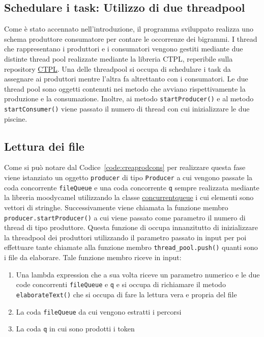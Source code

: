 \documentclass[10pt,twocolumn,letterpaper]{article}
\begin{document}
\subsection{Schedulare i task: Utilizzo di due threadpool}
\label{sub:schedularetask}
Come è stato accennato nell'introduzione, il programma sviluppato realizza uno schema produttore consumatore per contare le occorrenze dei bigrammi. I thread che
rappresentano i produttori e i consumatori vengono gestiti mediante due distinte thread pool realizzate mediante la libreria CTPL, reperibile sulla repository \href{https://github.com/vit-vit/CTPL}{CTPL}. Una delle threadpool si occupa di schedulare i task
da assegnare ai produttori mentre l'altra fa altrettanto con i consumatori. Le due thread pool sono oggetti contenuti nei metodo che avviano rispettivamente la produzione e la consumazione. Inoltre, ai metodo \texttt{startProducer()} e al metodo \texttt{startConsumer()} viene passato il numero di thread con cui inizializzare le due piscine.



\subsection{Lettura dei file}
\label{sub:letturafile}
Come si può notare dal Codice~\ref{code:creaprodcons} per realizzare questa fase viene istanziato un oggetto \texttt{producer} di tipo \texttt{Producer} a cui vengono passate la coda concorrente \texttt{fileQueue} e una coda concorrente \texttt{q}
sempre realizzata mediante la libreria moodycamel utilizzando la classe \href{https://github.com/cameron314/concurrentqueue/blob/master/concurrentqueue.h}{concurrentqueue} i cui elementi sono vettori di stringhe. Successivamente viene chiamata la 
funzione membro 
\texttt{producer.startProducer()}
 a cui viene passato come parametro il numero di thread di tipo produttore. 
 Questa funzione di occupa innanzitutto di inizializzare la threadpool dei produttori utilizzando il parametro passato in input per poi effettuare tante chiamate alla funzione membro 
 \texttt{thread\_pool.push()}
  quanti
sono i file da elaborare. Tale funzione membro riceve in input:
\begin{enumerate}
\item Una lambda expression che a sua volta riceve un parametro numerico e le due code concorrenti \texttt{fileQueue} e \texttt{q} e si occupa di richiamare il metodo \texttt{elaborateText()}
  che si occupa di fare la lettura vera e propria del file
\item La coda \texttt{fileQueue} da cui vengono estratti i percorsi
\item La coda \texttt{q} in cui sono prodotti i token
\end{enumerate}
\end{document}
